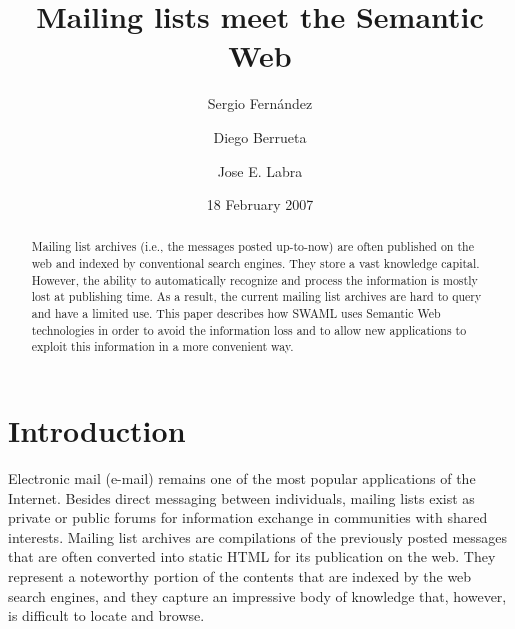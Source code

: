 \documentclass{llncs}
\begin{document}
\title{Mailing lists meet the Semantic Web}


\author{
Sergio Fern\'andez 
\and
Diego Berrueta 
\and
Jose E. Labra
}




\date{18 February 2007}

\maketitle

\begin{abstract}

Mailing list archives (i.e., the messages posted up-to-now) are often 
published on the web and indexed by conventional search engines. They 
store a vast knowledge capital. However, the ability to automatically 
recognize and process the information is mostly lost at publishing time. 
As a result, the current mailing list archives are hard to query and have 
a limited use. This paper describes how SWAML uses Semantic Web technologies 
in order to avoid the information loss and to allow new applications 
to exploit this information in a more convenient way.

\end{abstract}

\section{Introduction}

Electronic mail (e-mail) remains one of the most
popular applications of the Internet. Besides direct messaging
between individuals, mailing lists exist as private or public
forums for information exchange in communities with shared interests.
Mailing list archives are compilations of the previously posted
messages that are often converted into static HTML for its
publication on the web. They represent a noteworthy portion of
the contents that are indexed by the web search engines, and they
capture an impressive body of knowledge that, however, is difficult
to locate and browse.
\end{document}
